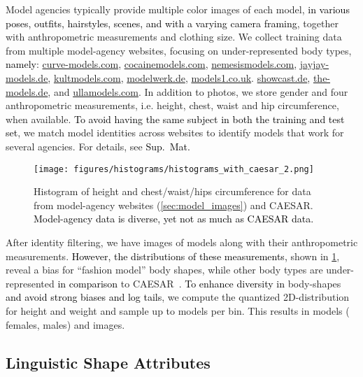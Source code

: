 \documentclass[10pt,twocolumn,letterpaper]{article}
\newcommand{\twoD}{2D\xspace}
\newcommand{\caesar}{\mbox{CAESAR}\xspace}
\newcommand{\supmat}{{\mbox{\textcolor{black}{Sup.~Mat.}}}\xspace}
\renewcommand{\ie}{\mbox{i.e.}\xspace}
\newcommand{\cameraready}[1]{\textcolor{Fuchsia}{{#1}}\xspace}
\renewcommand{\cameraready}[1]{\textcolor{black}{{#1}}\xspace}
\newcommand{\colorTERM}{blue}
\renewcommand{\colorTERM}{black}
\newcommand{\measurements}[0]{{\color{\colorTERM}anthropometric measurements}\xspace}
\newcommand{\LinguisticShapeAttributes}[0]{{\color{\colorTERM}Linguistic Shape Attributes}\xspace}
\begin{document}
Model agencies typically provide multiple color images of each model, \cameraready{in various poses, outfits, hairstyles, scenes, and with a varying camera framing}, together with 
\measurements
and clothing size.
We collect training data from multiple model-agency websites, focusing on under-represented body types, \cameraready{namely}:
\href{www.curve-models.com}{    \mbox{curve-models.com}},
\href{www.cocainemodels.com}{   \mbox{cocainemodels.com}},
\href{www.nemesismodels.com}{   \mbox{nemesismodels.com}},
\href{www.jayjay-models.de}{    \mbox{jayjay-models.de}},
\href{www.kultmodels.com}{      \mbox{kultmodels.com}},
\href{www.modelwerk.de}{        \mbox{modelwerk.de}},
\href{www.models1.co.uk}{       \mbox{models1.co.uk}}.
\href{showcast.de}{             \mbox{showcast.de}},
\href{www.the-models.de}{       \mbox{the-models.de}}, and
\href{www.ullamodels.com}{      \mbox{ullamodels.com}}.
In addition to photos, we store gender and four \measurements, \ie height, chest, waist and hip circumference, when available. 
\cameraready{To avoid 
having the same subject in both the training and test set}, we match model identities across websites to identify models that work for several agencies. 
For details, see \supmat

\begin{figure}[!t]
    \centering
    \texttt{[image: figures/histograms/histograms\_with\_caesar\_2.png]}
    \caption{Histogram of height and chest/waist/hips circumference for
        data from model-agency websites (\cref{sec:model_images}) and \caesar. \cameraready{Model-agency data is diverse, yet not as much as \caesar data.}
    }
    \label{fig:agencies_histogram}
\end{figure} 

After identity filtering, we have  images of  models along
with their 
\measurements. 
\cameraready{However, the distributions of these measurements,} shown in \cref{fig:agencies_histogram}, 
reveal a bias for ``fashion model'' body shapes, while other body types are under-represented \cameraready{in comparison} 
to \caesar~\cite{CAESAR}.
\cameraready{To enhance diversity in}
body-shapes \cameraready{and avoid strong biases and log tails}, 
we compute the quantized 
\twoD-distribution for height and weight and sample up to  models per bin.
This results in  models ( females,  males) and  images.



\subsection{\LinguisticShapeAttributes} 
\label{sec:attributes}
\end{document}
